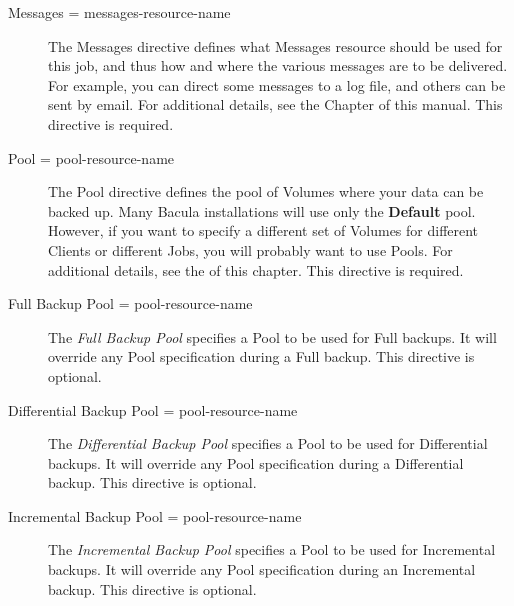 \begin{description}
\item [Messages = \lt{}messages-resource-name\gt{}]
   The Messages directive defines what Messages resource should be used for
   this job, and thus how and where the various messages are to be
   delivered.  For example, you can direct some messages to a log file, and
   others can be sent by email.  For additional details, see the
    Chapter of this manual.  This
   directive is required.

\item [Pool = \lt{}pool-resource-name\gt{}]
   The Pool directive defines the pool of Volumes where your data can be
   backed up.  Many Bacula installations will use only the {\bf Default}
   pool.  However, if you want to specify a different set of Volumes for
   different Clients or different Jobs, you will probably want to use
   Pools.  For additional details, see the  of this chapter.  This directive is required.

\item [Full Backup Pool = \lt{}pool-resource-name\gt{}]
   The {\it Full Backup Pool} specifies a Pool to be used for Full backups.
   It will override any Pool specification during a Full backup.  This
   directive is optional.
   
\item [Differential Backup Pool = \lt{}pool-resource-name\gt{}]  
   The {\it Differential Backup Pool} specifies a Pool to be used for
   Differential backups.  It will override any Pool specification during a
   Differential backup.  This directive is optional.
   
\item [Incremental Backup Pool = \lt{}pool-resource-name\gt{}]  
   The {\it Incremental Backup Pool} specifies a Pool to be used for
   Incremental backups.  It will override any Pool specification during an
   Incremental backup.  This directive is optional.


\end{description}
